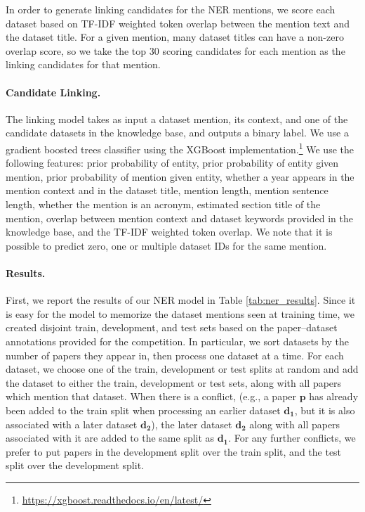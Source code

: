 In order to generate linking candidates for the NER mentions, we score each dataset based on TF-IDF weighted token overlap between the mention text and the dataset title. For a given mention, many dataset titles can have a non-zero overlap score, so we take the top 30 scoring candidates for each mention as the linking candidates for that mention.

\paragraph{Candidate Linking.}
The linking model takes as input a dataset mention, its context, and one of the candidate datasets in the knowledge base, and outputs a binary label.
We use a gradient boosted trees classifier using the  XGBoost implementation.\footnote{\url{https://xgboost.readthedocs.io/en/latest/}}
We use the following features:
prior probability of entity, prior probability of entity given mention, prior probability of mention given entity, whether a year appears in the mention context and in the dataset title, mention length, mention sentence length, whether the mention is an acronym, estimated section title of the mention, overlap between mention context and dataset keywords provided in the knowledge base, and the TF-IDF weighted token overlap.
We note that it is possible to predict zero, one or multiple dataset IDs for the same mention.

\paragraph{Results.}
First, we report the results of our NER model in Table \ref{tab:ner_results}. 
Since it is easy for the model to memorize the dataset mentions seen at training time, we created disjoint train, development, and test sets based on the paper--dataset annotations provided for the competition.
In particular, we sort datasets by the number of papers they appear in, then process one dataset at a time.
For each dataset, we choose one of the train, development or test splits at random and add the dataset to either the train, development or test sets, along with all papers which mention that dataset.
When there is a conflict, (e.g., a paper $\mathbf{p}$ has already been added to the train split when processing an earlier dataset $\mathbf{d_1}$, but it is also associated with a later dataset $\mathbf{d_2}$), the later dataset $\mathbf{d_2}$ along with all papers associated with it are added to the same split as $\mathbf{d_1}$. For any further conflicts, we prefer to put papers in the development split over the train split, and the test split over the development split.

